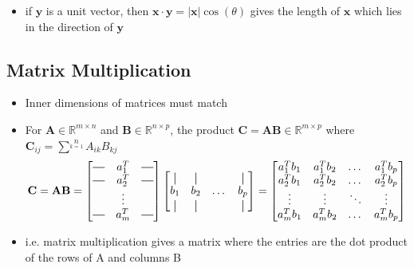 \documentclass[letterpaper,12pt]{article}
\newcommand{\vect}[1]{\mathbf{#1}}
\newcommand{\matr}[1]{\mathbf{#1}}
\newcommand{\abs}[1]{\lvert#1\rvert}
\newcommand*{\vertbar}{\rule[-1ex]{0.5pt}{2.5ex}} %
\newcommand*{\horzbar}{\rule[.5ex]{2.5ex}{0.5pt}}
\begin{document}
\begin{itemize}
 \item if $\vect{y}$ is a unit vector, then $\vect{x} \cdot \vect{y} = \abs{\vect{x}}\cos(\theta)$ gives the length of $\vect{x}$ which lies in the direction of $\vect{y}$
\end{itemize}

\subsection{Matrix Multiplication}
\begin{itemize}
 \item Inner dimensions of matrices must match
 \item For $\matr{A} \in \mathbb{R}^{m \times n}$ and $\matr{B} \in \mathbb{R}^{n \times p}$, the product $\matr{C} = \matr{A} \matr{B} \in \mathbb{R}^{m \times p}$ where $\matr{C}_{ij} = \sum\limits^{n}\limits_{k=1} A_{ik}B_{kj}$
       \begin{align}
        \matr{C} = \matr{A}\matr{B} =  \begin{bmatrix}
         \horzbar & a_{1}^{T} & \horzbar \\
         \horzbar & a_{2}^{T} & \horzbar \\
                  & \vdots    &          \\
         \horzbar & a_{m}^{T} & \horzbar
        \end{bmatrix}
        \begin{bmatrix}
         \vertbar & \vertbar &       & \vertbar \\
         b_{1}    & b_{2}    & \dots & b_{p}    \\
         \vertbar & \vertbar &       & \vertbar
        \end{bmatrix}
        =
        \begin{bmatrix}
         a_{1}^{T}b_{1} & a_{1}^{T}b_{2} & \dots  & a_{1}^{T}b_{p} \\
         a_{2}^{T}b_{1} & a_{2}^{T}b_{2} & \dots  & a_{2}^{T}b_{p} \\
         \vdots         & \vdots         & \ddots & \vdots         \\
         a_{m}^{T}b_{1} & a_{m}^{T}b_{2} & \dots  & a_{m}^{T}b_{p}
        \end{bmatrix}
       \end{align}
 \item i.e. matrix multiplication gives a matrix where the entries are the dot product of the rows of A and columns B
\end{itemize}
\end{document}
